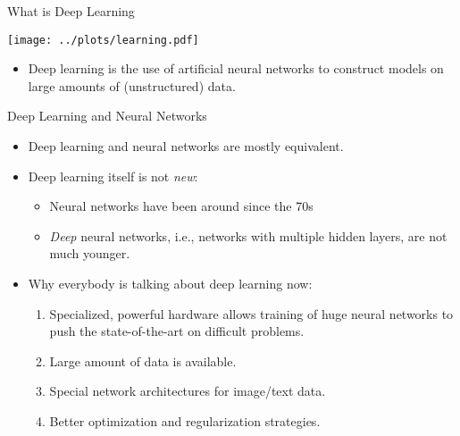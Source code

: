 







\begin{frame} {What is Deep Learning}
\begin{center}
\texttt{[image: ../plots/learning.pdf]}
\end{center}
\vspace{-.5cm}
\begin{itemize}
\item Deep learning is the use of artificial neural networks to
construct models on large amounts of (unstructured) data.
\end{itemize}
\end{frame}

\begin{frame} {Deep Learning and Neural Networks}
\begin{itemize}
\item Deep learning and neural networks are mostly equivalent.
\vspace{.3cm}
\item Deep learning itself is not \textit{new}:
\begin{itemize}
\item Neural networks have been around since the 70s
\item \textit{Deep} neural networks, i.e., networks with multiple hidden layers, are not much younger.
\end{itemize}
\vspace{.3cm}
\item Why everybody is talking about deep learning now:
\begin{enumerate}
\vspace{.1cm}
\item Specialized, powerful hardware allows training of huge neural networks to push the state-of-the-art on difficult problems.
\vspace{.2cm}
\item Large amount of data is available.
\vspace{.2cm}
\item Special network architectures for image/text data.
\vspace{.2cm}
\item Better optimization and regularization strategies.
\end{enumerate}
\end{itemize}
\end{frame}

